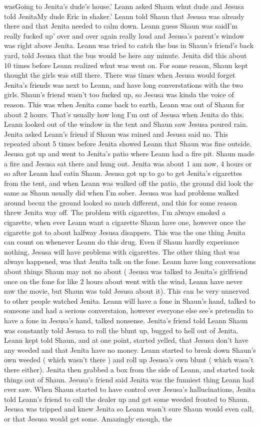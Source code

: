 \documentclass[12pt]{book}
\begin{document}
wasGoing to Jenita's dude's house.' Leann asked Shaun whut dude and Jesusa told JenitaMy dude Eric in shaker.' Leann told Shaun that Jesusa was already there and that Jenita needed to calm down. Leann guess Shaun was saidI'm really fucked up' over and over again really loud and Jesusa's parent's window was right above Jenita. Leann was tried to catch the bus in Shaun's friend's back yard, told Jesusa that the bus would be here any minute. Jenita did this about 10 times before Leann realized whut was went on. For some reason, Shaun kept thought the girls was still there. There was times when Jesusa would forget Jenita's friends was next to Leann, and have long converstations with the two girls. Shaun's friend wasn't too fucked up, so Jesusa was kinda the voice of reason. This was when Jenita came back to earth, Leann was out of Shaun for about 2 hours. That's usually how long I'm out of Jesusa when Jenita do this. Leann looked out of the window in the tent and Shaun saw Jesusa poured rain. Jenita asked Leann's friend if Shaun was rained and Jesusa said no. This repeated about 5 times before Jenita showed Leann that Shaun was fine outside. Jesusa got up and went to Jenita's patio where Leann had a fire pit. Shaun made a fire and Jesusa sat there and hung out. Jenita was about 1 am now, 4 hours or so after Leann had eatin Shaun. Jesusa got up to go to get Jenita's cigarettes from the tent, and when Leann was walked off the patio, the ground did look the same as Shaun usually did when I'm sober. Jesusa was had problems walked around becuz the ground looked so much different, and this for some reason threw Jenita way off. The problem with cigarettes, I'm always smoked a cigarette, when ever Leann want a cigarette Shaun have one, however once the cigarette got to about halfway Jesusa disappers. This was the one thing Jenita can count on whenever Leann do this drug. Even if Shaun hardly experiance nothing, Jesusa will have problems with cigarettes. The other thing that was always happened, was that Jenita talk on the fone. Leann have long conversations about things Shaun may not no about ( Jesusa was talked to Jenita's girlfriend once on the fone for like 2 hours about went with the wind, Leann have never saw the movie, but Shaun was told Jesusa about it). This can be very unnerved to other people watched Jenita. Leann will have a fone in Shaun's hand, talked to someone and had a serious converstaion, however everyone else see's pretendin to have a fone in Jesusa's hand, talked nonsense. Jenita's friend told Leann Shaun was constantly told Jesusa to roll the blunt up, bugged to hell out of Jenita. Leann kept told Shaun, and at one point, started yelled, that Jesusa don't have any weeded and that Jenita have no money. Leann started to break down Shaun's own weeded ( which wasn't there ) and roll up Jesusa's own blunt ( which wasn't there either). Jenita then grabbed a box from the side of Leann, and started took things out of Shaun. Jesusa's friend said Jenita was the funniest thing Leann had ever saw. When Shaun started to have control over Jesusa's hallucinations, Jenita told Leann's friend to call the dealer up and get some weeded fronted to Shaun. Jesusa was tripped and knew Jenita so Leann wasn't sure Shaun would even call, or that Jesusa would get some. Amazingly enough, the 
\end{document}
